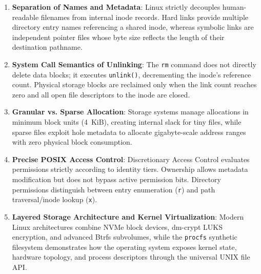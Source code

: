 \documentclass[12pt,a4paper]{article}
\begin{document}
\begin{enumerate}
    \item \textbf{Separation of Names and Metadata}: Linux strictly decouples human-readable filenames from internal inode records. Hard links provide multiple directory entry names referencing a shared inode, whereas symbolic links are independent pointer files whose byte size reflects the length of their destination pathname.
    \item \textbf{System Call Semantics of Unlinking}: The \texttt{rm} command does not directly delete data blocks; it executes \texttt{unlink()}, decrementing the inode's reference count. Physical storage blocks are reclaimed only when the link count reaches zero and all open file descriptors to the inode are closed.
    \item \textbf{Granular vs. Sparse Allocation}: Storage systems manage allocations in minimum block units (4~KiB), creating internal slack for tiny files, while sparse files exploit hole metadata to allocate gigabyte-scale address ranges with zero physical block consumption.
    \item \textbf{Precise POSIX Access Control}: Discretionary Access Control evaluates permissions strictly according to identity tiers. Ownership allows metadata modification but does not bypass active permission bits. Directory permissions distinguish between entry enumeration (\texttt{r}) and path traversal/inode lookup (\texttt{x}).
    \item \textbf{Layered Storage Architecture and Kernel Virtualization}: Modern Linux architectures combine NVMe block devices, dm-crypt LUKS encryption, and advanced Btrfs subvolumes, while the \texttt{procfs} synthetic filesystem demonstrates how the operating system exposes kernel state, hardware topology, and process descriptors through the universal UNIX file API.
\end{enumerate}
\end{document}
